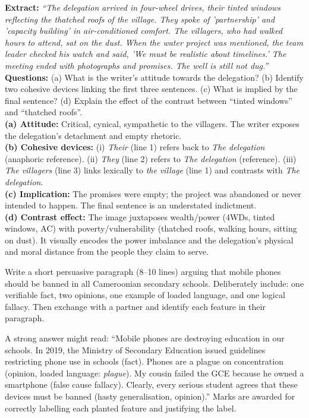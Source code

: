 \documentclass[11pt]{article}
\begin{document}
\begin{exoresolu}
\textbf{Extract:} \emph{``The delegation arrived in four-wheel drives, their tinted windows reflecting the thatched roofs of the village. They spoke of 'partnership' and 'capacity building' in air-conditioned comfort. The villagers, who had walked hours to attend, sat on the dust. When the water project was mentioned, the team leader checked his watch and said, 'We must be realistic about timelines.' The meeting ended with photographs and promises. The well is still not dug.''}\\
\textbf{Questions:} (a) What is the writer's attitude towards the delegation? (b) Identify two cohesive devices linking the first three sentences. (c) What is implied by the final sentence? (d) Explain the effect of the contrast between ``tinted windows'' and ``thatched roofs''.\\
\tcblower
\textbf{(a) Attitude:} Critical, cynical, sympathetic to the villagers. The writer exposes the delegation's detachment and empty rhetoric.\\
\textbf{(b) Cohesive devices:} (i) \emph{Their} (line 1) refers back to \emph{The delegation} (anaphoric reference). (ii) \emph{They} (line 2) refers to \emph{The delegation} (reference). (iii) \emph{The villagers} (line 3) links lexically to \emph{the village} (line 1) and contrasts with \emph{The delegation}.\\
\textbf{(c) Implication:} The promises were empty; the project was abandoned or never intended to happen. The final sentence is an understated indictment.\\
\textbf{(d) Contrast effect:} The image juxtaposes wealth/power (4WDs, tinted windows, AC) with poverty/vulnerability (thatched roofs, walking hours, sitting on dust). It visually encodes the power imbalance and the delegation's physical and moral distance from the people they claim to serve.
\end{exoresolu}

\begin{exercice}
Write a short persuasive paragraph (8--10 lines) arguing that mobile phones should be banned in all Cameroonian secondary schools. Deliberately include: one verifiable fact, two opinions, one example of loaded language, and one logical fallacy. Then exchange with a partner and identify each feature in their paragraph.
\end{exercice}

\begin{corrige}
A strong answer might read: ``Mobile phones are destroying education in our schools. In 2019, the Ministry of Secondary Education issued guidelines restricting phone use in schools (fact). Phones are a plague on concentration (opinion, loaded language: \emph{plague}). My cousin failed the GCE because he owned a smartphone (false cause fallacy). Clearly, every serious student agrees that these devices must be banned (hasty generalisation, opinion).'' Marks are awarded for correctly labelling each planted feature and justifying the label.
\end{corrige}
\end{document}
